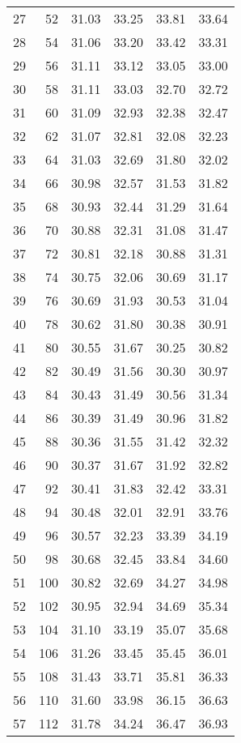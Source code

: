 \begin{longtable}{rrllll}
		27 & 52 & 31.03 & 33.25 & 33.81 & 33.64 \\ 
		28 & 54 & 31.06 & 33.20 & 33.42 & 33.31 \\ 
		29 & 56 & 31.11 & 33.12 & 33.05 & 33.00 \\ 
		30 & 58 & 31.11 & 33.03 & 32.70 & 32.72 \\ 
		31 & 60 & 31.09 & 32.93 & 32.38 & 32.47 \\ 
		32 & 62 & 31.07 & 32.81 & 32.08 & 32.23 \\ 
		33 & 64 & 31.03 & 32.69 & 31.80 & 32.02 \\ 
		34 & 66 & 30.98 & 32.57 & 31.53 & 31.82 \\ 
		35 & 68 & 30.93 & 32.44 & 31.29 & 31.64 \\ 
		36 & 70 & 30.88 & 32.31 & 31.08 & 31.47 \\ 
		37 & 72 & 30.81 & 32.18 & 30.88 & 31.31 \\ 
		38 & 74 & 30.75 & 32.06 & 30.69 & 31.17 \\ 
		39 & 76 & 30.69 & 31.93 & 30.53 & 31.04 \\ 
		40 & 78 & 30.62 & 31.80 & 30.38 & 30.91 \\ 
		41 & 80 & 30.55 & 31.67 & 30.25 & 30.82 \\ 
		42 & 82 & 30.49 & 31.56 & 30.30 & 30.97 \\ 
		43 & 84 & 30.43 & 31.49 & 30.56 & 31.34 \\ 
		44 & 86 & 30.39 & 31.49 & 30.96 & 31.82 \\ 
		45 & 88 & 30.36 & 31.55 & 31.42 & 32.32 \\ 
		46 & 90 & 30.37 & 31.67 & 31.92 & 32.82 \\ 
		47 & 92 & 30.41 & 31.83 & 32.42 & 33.31 \\ 
		48 & 94 & 30.48 & 32.01 & 32.91 & 33.76 \\ 
		49 & 96 & 30.57 & 32.23 & 33.39 & 34.19 \\ 
		50 & 98 & 30.68 & 32.45 & 33.84 & 34.60 \\ 
		51 & 100 & 30.82 & 32.69 & 34.27 & 34.98 \\ 
		52 & 102 & 30.95 & 32.94 & 34.69 & 35.34 \\ 
		53 & 104 & 31.10 & 33.19 & 35.07 & 35.68 \\ 
		54 & 106 & 31.26 & 33.45 & 35.45 & 36.01 \\ 
		55 & 108 & 31.43 & 33.71 & 35.81 & 36.33 \\ 
		56 & 110 & 31.60 & 33.98 & 36.15 & 36.63 \\ 
		57 & 112 & 31.78 & 34.24 & 36.47 & 36.93 \\ 

\end{longtable}
